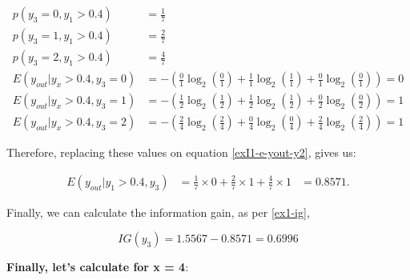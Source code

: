 \documentclass[12pt]{article}
\begin{document}
\begin{enumerate}[leftmargin=\labelsep]
    \[
        \begin{aligned}
            p(y_3 = 0, y_1 > 0.4)          & = \frac{1}{7}                                                                                    \\
            p(y_3 = 1, y_1 > 0.4)          & = \frac{2}{7}                                                                                    \\
            p(y_3 = 2, y_1 > 0.4)          & = \frac{4}{7}                                                                                    \\
            E(y_{out} | y_x > 0.4 , y_3 = 0) & = - \left(\frac{0}{1} \log_2\left(\frac{0}{1}\right) + \frac{1}{1} \log_2\left(\frac{1}{1}\right)
                + \frac{0}{1} \log_2\left(\frac{0}{1}\right)\right) = 0                                                                       \\
            E(y_{out} | y_x > 0.4 , y_3 = 1) & = - \left(\frac{1}{2} \log_2\left(\frac{1}{2}\right) + \frac{1}{2} \log_2\left(\frac{1}{2}\right)
                + \frac{0}{2} \log_2\left(\frac{0}{2}\right)\right) = 1                                                                       \\
            E(y_{out} | y_x > 0.4 , y_3 = 2) & = - \left(\frac{2}{4} \log_2\left(\frac{2}{4}\right) + \frac{0}{4} \log_2\left(\frac{0}{4}\right)
                + \frac{2}{4} \log_2\left(\frac{2}{4}\right)\right) = 1
        \end{aligned}
    \]

    Therefore, replacing these values on equation \eqref{exI1-e-yout-y2}, gives us:

    \[
        \begin{aligned}
            E(y_{out} | y_1>0.4, y_3) & = \frac{1}{7} \times 0 + \frac{2}{7} \times 1 +  \frac{4}{7} \times 1 & = 0.8571.
        \end{aligned}
    \]

    Finally, we can calculate the information gain, as per \eqref{ex1-ig},

    \[
        IG(y_{3}) = 1.5567 - 0.8571 = 0.6996
    \]

    \textbf{Finally, let's calculate for x = 4}:


\end{enumerate}
\end{document}
